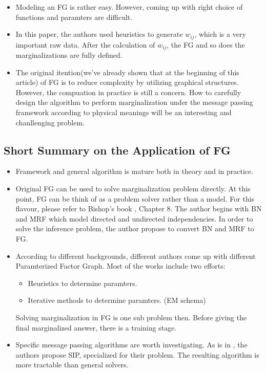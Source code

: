 \documentclass[11pt,a4paper]{article}
\begin{document}
\begin{itemize}
	\item Modeling an FG is rather easy. However, coming up with 
	right choice of functions and paramters are difficult. 
	\item In this paper, the authors used heuristics to generate 
	$w_{ij}$, which is a very important raw data. After the calculation 
	of $w_{ij}$, the FG and so does the marginalizations are fully defined. 
	\item The original itention(we've already shown that at the beginning
	of this article) of FG is to reduce complexity by utilizing graphical 
	structures. However, the compuation in practice is still a concern. 
	How to carefully design the algorithm to perform marginalization 
	under the message passing framework according to physical 
	meanings will be an interesting and chanllenging problem.   
\end{itemize}

\subsection{Short Summary on the Application of FG}

\begin{itemize}
	\item Framework and general algorithm is mature both in 
	theory and in practice. 
	\item Original FG can be used to solve marginalization problem 
	directly. At this point, FG can be think of as a problem solver
	rather than a model. For this flavour, please refer to Bishop's book
	\cite{bishop2006pattern}, Chapter 8. The author begins with 
	BN and MRF which model directed and undirected independencies. 
	In order to solve the inference problem, the author propose to 
	convert BN and MRF to FG. 
	\item According to different backgrounds, different authors 
	come up with different Paramterized Factor Graph. 
	Most of the works include two efforts: 
		\begin{itemize}
			\item Heuristics to determine paramters. 
			\item Iterative methods to determine paramters. 
			(EM schema)
		\end{itemize}			
	Solving marginalization in FG is one sub problem then. Before
	giving the final marginalized answer, there is a training stage. 
	\item Specific message passing algorithms are worth investigating. 
	As is in \cite{wang2011-dynamic}, the authors propose SIP, specialized 
	for their problem. The resulting algorithm is more tractable than 
	general solvers. 
\end{itemize}
\end{document}
